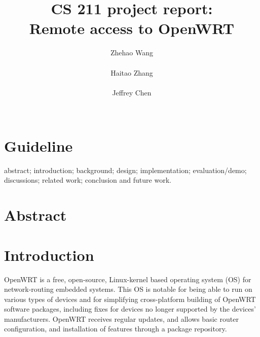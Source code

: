 \documentclass{sig-alternate-05-2015}
\begin{document}
	
	\title{CS 211 project report: \\Remote access to OpenWRT}
	
	
	\author{
		\alignauthor
		Zhehao Wang \\
               \\
		\alignauthor
		Haitao Zhang \\
               \\
		\alignauthor 
		Jeffrey Chen\\
               \\
	}
	
	\maketitle
	\section{Guideline}

	abstract; 
	introduction; 
	background;
	design; 
	implementation; 
	evaluation/demo; 
	discussions; 
	related work; 
	conclusion and future work.

	\section{Abstract}
	\section{Introduction}
	
	OpenWRT is a free, open-source, Linux-kernel based operating system (OS) for network-routing embedded systems. This OS is notable for being able to run on various types of devices and for simplifying cross-platform building of OpenWRT software packages, including fixes for devices no longer supported by the devices' manufacturers. OpenWRT receives regular updates, and allows basic router configuration, and installation of features through a package repository.
	
\end{document}
